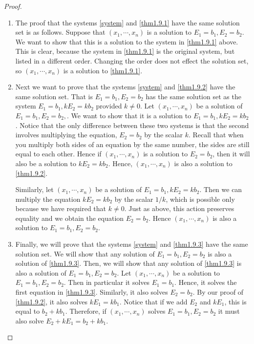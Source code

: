 \begin{proof} 
\begin{enumerate}
\item
The proof that the systems \ref{system} and \ref{thm1.9.1} have the
same solution set is as follows. Suppose that $\left( x_{1},\cdots
,x_{n}\right) $ is a solution to $E_{1}=b_{1},E_{2}=b_{2}$. We want to
show that this is a solution to the system in \ref{thm1.9.1} above.
This is clear, because the system in \ref{thm1.9.1} is the original
system, but listed in a different order. Changing the order does not
effect the solution set, so $\left( x_{1},\cdots ,x_{n}\right) $ is a
solution to \ref{thm1.9.1}.

\item
Next we want to prove that the systems \ref{system} and \ref{thm1.9.2} have the
same solution set. That is  $E_{1}=b_{1},E_{2}=b_{2}$ has
the same solution set as the system $E_{1}=b_{1},kE_{2}=kb_{2}$ provided $k\neq
0 $. Let $\left( x_{1},\cdots ,x_{n}\right) $ be a
solution of $E_{1}=b_{1},E_{2}=b_{2},$. We want to show that it is a solution to $E_{1}=b_{1},kE_{2}=kb_{2}$.
Notice that the only difference between these two systems is that the second involves
multiplying the equation, $E_{2}=b_{2}$ by the scalar $k$. Recall that when you multiply both sides of an 
equation by the same number, the sides are still equal to each other. Hence if  $\left( x_{1},\cdots ,x_{n}\right) $
is a solution to $E_{2}=b_{2}$, then it will also be a solution to $kE_{2}=kb_{2}$. Hence, $\left( x_{1},\cdots ,x_{n}\right) $ is also
a solution to \ref{thm1.9.2}. 

Similarly, let $\left( x_{1},\cdots
,x_{n}\right) $ be a solution of $E_{1}=b_{1},kE_{2}=kb_{2}$. Then we can 
multiply the equation $kE_{2}=kb_{2}$ by the scalar $1/k$, which is possible only because we have required that $k\neq
0$. Just as above, this action preserves equality and we obtain the equation $E_{2} = b_{2}$. 
Hence $\left( x_{1},\cdots ,x_{n}\right)$ is also a solution to  $E_{1}=b_{1},E_{2}=b_{2}.$ 

\item
Finally, we will prove that the systems \ref{system} and
\ref{thm1.9.3} have the same solution set. We will show that any
solution of $E_{1}=b_{1},E_{2}=b_{2}$ is also a solution of
\ref{thm1.9.3}. Then, we will show that any solution of \ref{thm1.9.3}
is also a solution of $E_{1}=b_{1},E_{2}=b_{2}$.  Let $\left(
x_{1},\cdots ,x_{n}\right) $ be a solution to
$E_{1}=b_{1},E_{2}=b_{2}$. Then in particular it solves $E_{1} =
b_{1}$. Hence, it solves the first equation in \ref{thm1.9.3}.
Similarly, it also solves $E_{2} = b_{2}$. By our proof of
\ref{thm1.9.2}, it also solves $kE_{1}=kb_{1}$.  Notice that if we add
$E_{2}$ and $kE_{1}$, this is equal to $b_{2} + kb_{1}$. Therefore, if
$\left( x_{1},\cdots ,x_{n}\right) $ solves $E_{1}=b_{1},E_{2}=b_{2}$
it must also solve $E_{2}+kE_{1}=b_{2}+kb_{1}$.


\end{enumerate}
\end{proof}
